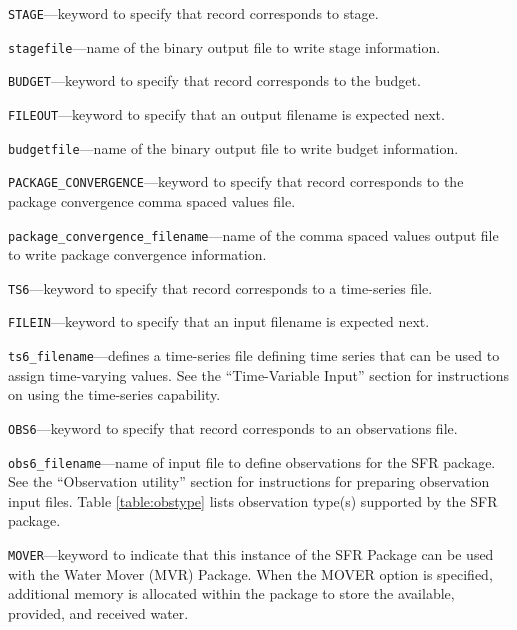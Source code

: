 \begin{description}
\item \texttt{STAGE}---keyword to specify that record corresponds to stage.

\item \texttt{stagefile}---name of the binary output file to write stage information.

\item \texttt{BUDGET}---keyword to specify that record corresponds to the budget.

\item \texttt{FILEOUT}---keyword to specify that an output filename is expected next.

\item \texttt{budgetfile}---name of the binary output file to write budget information.

\item \texttt{PACKAGE\_CONVERGENCE}---keyword to specify that record corresponds to the package convergence comma spaced values file.

\item \texttt{package\_convergence\_filename}---name of the comma spaced values output file to write package convergence information.

\item \texttt{TS6}---keyword to specify that record corresponds to a time-series file.

\item \texttt{FILEIN}---keyword to specify that an input filename is expected next.

\item \texttt{ts6\_filename}---defines a time-series file defining time series that can be used to assign time-varying values. See the ``Time-Variable Input'' section for instructions on using the time-series capability.

\item \texttt{OBS6}---keyword to specify that record corresponds to an observations file.

\item \texttt{obs6\_filename}---name of input file to define observations for the SFR package. See the ``Observation utility'' section for instructions for preparing observation input files. Table \ref{table:obstype} lists observation type(s) supported by the SFR package.

\item \texttt{MOVER}---keyword to indicate that this instance of the SFR Package can be used with the Water Mover (MVR) Package.  When the MOVER option is specified, additional memory is allocated within the package to store the available, provided, and received water.


\end{description}
